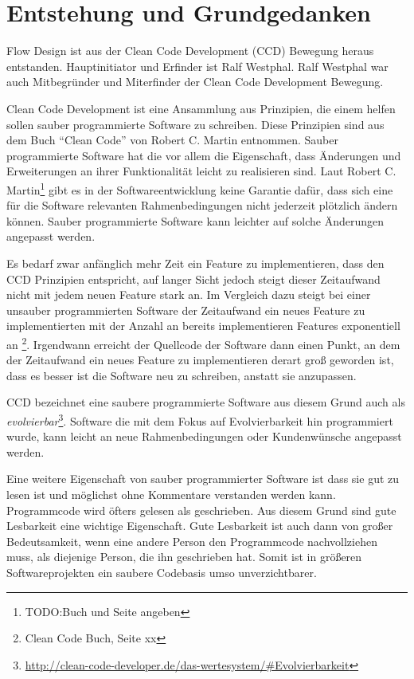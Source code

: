 \chapter{Entstehung und Grundgedanken}


Flow Design ist aus der Clean Code Development  (CCD) Bewegung heraus entstanden. Hauptinitiator und Erfinder ist Ralf Westphal.
Ralf Westphal war auch Mitbegründer und Miterfinder der Clean Code Development Bewegung.


Clean Code Development ist eine Ansammlung aus Prinzipien, die einem helfen
sollen sauber programmierte Software zu schreiben. Diese Prinzipien sind aus dem Buch \enquote{Clean Code} von Robert C. Martin entnommen. Sauber programmierte Software hat 
die vor allem die Eigenschaft, dass Änderungen und Erweiterungen an ihrer Funktionalität
leicht zu realisieren sind. Laut Robert C. Martin\footnote{TODO:Buch und Seite angeben} gibt es in der Softwareentwicklung
keine Garantie dafür, dass sich eine für die Software relevanten
Rahmenbedingungen nicht jederzeit plötzlich ändern können. Sauber programmierte
Software kann leichter auf solche Änderungen angepasst werden. 

Es bedarf zwar anfänglich mehr Zeit ein Feature zu implementieren, dass den CCD Prinzipien entspricht, auf langer
Sicht jedoch steigt dieser Zeitaufwand nicht mit jedem neuen Feature stark
an. Im Vergleich dazu steigt bei einer unsauber programmierten Software der Zeitaufwand ein neues
Feature zu implementierten mit der Anzahl an bereits implementieren Features
exponentiell an \footnote{Clean Code Buch, Seite xx}. Irgendwann erreicht der Quellcode der Software dann einen Punkt, an
dem der Zeitaufwand ein neues Feature zu implementieren derart groß geworden ist, dass es besser ist die Software neu zu schreiben, anstatt sie anzupassen.

CCD bezeichnet eine saubere programmierte Software aus diesem Grund auch als \emph{evolvierbar}\footnote{\url{http://clean-code-developer.de/das-wertesystem/\#Evolvierbarkeit}}.
Software die mit dem Fokus auf Evolvierbarkeit hin programmiert wurde,
kann leicht an neue Rahmenbedingungen oder Kundenwünsche angepasst werden.


Eine weitere Eigenschaft von sauber programmierter Software ist dass sie gut zu
lesen ist und möglichst ohne Kommentare verstanden werden kann.
Programmcode wird öfters gelesen als geschrieben. Aus diesem Grund sind gute
Lesbarkeit eine wichtige Eigenschaft. Gute Lesbarkeit ist auch dann von großer
Bedeutsamkeit, wenn eine andere Person den Programmcode nachvollziehen muss, als diejenige Person, die ihn geschrieben hat.
Somit ist in größeren Softwareprojekten ein saubere Codebasis umso unverzichtbarer.

